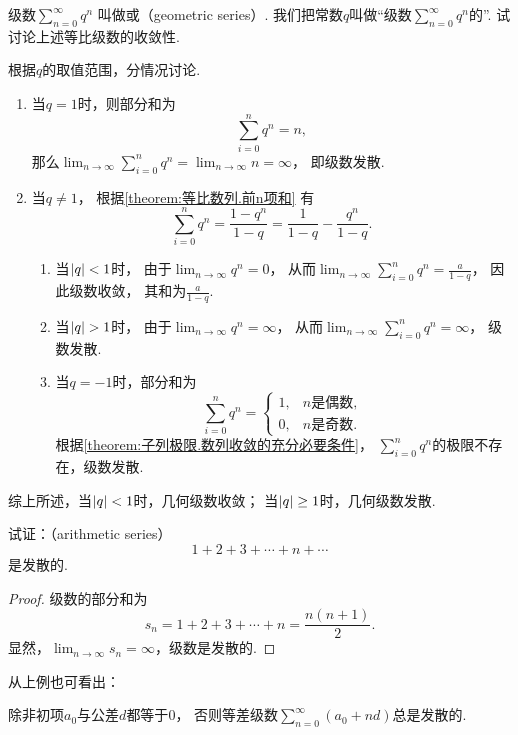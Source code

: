 \begin{example}\label{example:无穷级数.等比级数的收敛性}
级数\(\sum_{n=0}^\infty q^n\)
叫做或（geometric series）.
我们把常数\(q\)叫做“级数\(\sum_{n=0}^\infty q^n\)的”.
试讨论上述等比级数的收敛性.
\begin{solution}
根据\(q\)的取值范围，分情况讨论.
\begin{enumerate}
	\item 当\(q = 1\)时，则部分和为\[
		\sum_{i=0}^n q^n
		= n,
	\]
	那么\(\lim_{n\to\infty} \sum_{i=0}^n q^n
	= \lim_{n\to\infty} n
	= \infty\)，
	即级数发散.

	\item 当\(q \neq 1\)，
	根据\cref{theorem:等比数列.前n项和} 有\[
		\sum_{i=0}^n q^n
		= \frac{1-q^n}{1-q}
		= \frac{1}{1-q} - \frac{q^n}{1-q}.
	\]
	\begin{enumerate}
		\item 当\(\abs{q} < 1\)时，
		由于\(\lim_{n\to\infty} q^n=0\)，
		从而\(\lim_{n\to\infty} \sum_{i=0}^n q^n
		=\frac{a}{1-q}\)，
		因此级数收敛，
		其和为\(\frac{a}{1-q}\).

		\item 当\(\abs{q} > 1\)时，
		由于\(\lim_{n\to\infty} q^n=\infty\)，
		从而\(\lim_{n\to\infty} \sum_{i=0}^n q^n
		=\infty\)，
		级数发散.

		\item 当\(q = -1\)时，部分和为\[
			\sum_{i=0}^n q^n
			= \begin{cases}
				1, & \text{\(n\)是偶数}, \\
				0, & \text{\(n\)是奇数}.
			\end{cases}
		\]
		根据\cref{theorem:子列极限.数列收敛的充分必要条件}，
		\(\sum_{i=0}^n q^n\)的极限不存在，级数发散.
	\end{enumerate}
\end{enumerate}

综上所述，{\color{red}当\(\abs{q} < 1\)时，几何级数收敛；
当\(\abs{q} \geq 1\)时，几何级数发散.}
\end{solution}
\end{example}

\begin{example}\label{example:无穷级数.等差级数的收敛性}
试证：（arithmetic series）\[
	1+2+3+\dotsb+n+\dotsb
\]是发散的.
\begin{proof}
级数的部分和为\[
	s_n = 1+2+3+\dotsb+n = \frac{n(n+1)}{2}.
\]
显然，\(\lim_{n\to\infty} s_n=\infty\)，级数是发散的.
\end{proof}
\end{example}
从上例也可看出：
\begin{proposition}
除非初项\(a_0\)与公差\(d\)都等于\(0\)，
否则等差级数\(\sum_{n=0}^\infty(a_0+nd)\)总是发散的.
\end{proposition}

